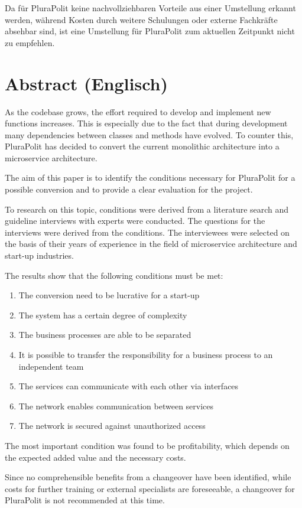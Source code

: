 Da für PluraPolit keine nachvollziehbaren Vorteile aus einer Umstellung erkannt werden, während Kosten durch weitere Schulungen oder externe Fachkräfte absehbar sind, ist eine Umstellung für PluraPolit zum aktuellen Zeitpunkt nicht zu empfehlen.

\newpage

\section*{Abstract (Englisch)}

As the codebase grows, the effort required to develop and implement new functions increases. This is especially due to the fact that during development many dependencies between classes and methods have evolved. To counter this, PluraPolit has decided to convert the current monolithic architecture into a microservice architecture.

The aim of this paper is to identify the conditions necessary for PluraPolit for a possible conversion and to provide a clear evaluation for the project.

To research on this topic, conditions were derived from a literature search and guideline interviews with experts were conducted. The questions for the interviews were derived from the conditions. The interviewees were selected on the basis of their years of experience in the field of microservice architecture and start-up industries.

The results show that the following conditions must be met:
\begin{enumerate}
	\item The conversion need to be lucrative for a start-up
	\item The system has a certain degree of complexity
	\item The business processes are able to be separated
	\item It is possible to transfer the responsibility for a business process to an independent team
	\item The services can communicate with each other via interfaces
	\item The network enables communication between services
	\item The network is secured against unauthorized access
\end{enumerate}

The most important condition was found to be profitability, which depends on the expected added value and the necessary costs.

Since no comprehensible benefits from a changeover have been identified, while costs for further training or external specialists are foreseeable, a changeover for PluraPolit is not recommended at this time.
